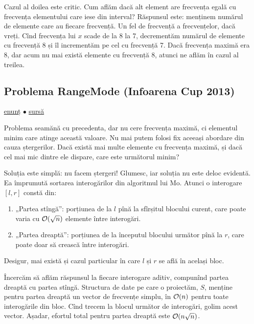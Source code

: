 \documentclass[../main.tex]{subfiles}
\begin{document}
Cazul al doilea este critic. Cum aflăm dacă alt element are frecvența egală cu frecvența elementului care iese din interval? Răspunsul este: menținem numărul de elemente care au fiecare frecvență. Un fel de frecvență a frecvențelor, dacă vreți.  Cînd frecvența lui $x$ scade de la 8 la 7, decrementăm numărul de elemente cu frecvență 8 și îl incrementăm pe cel cu frecvență 7. Dacă frecvența maximă era 8, dar acum nu mai există elemente cu frecvență 8, atunci ne aflăm în cazul al treilea.

\subsection{Problema RangeMode (Infoarena Cup 2013)}
\label{problem:rangemode}

\href{https://www.infoarena.ro/problema/rangemode}{enunț}
$\bullet$
\hyperref[code:rangemode]{sursă}

Problema seamănă cu precedenta, dar nu cere frecvența maximă, ci elementul minim care atinge această valoare. Nu mai putem folosi fix aceeași abordare din cauza ștergerilor. Dacă există mai multe elemente cu frecvența maximă, și dacă cel mai mic dintre ele dispare, care este următorul minim?

Soluția este simplă: nu facem ștergeri!  Glumesc, iar soluția nu este deloc evidentă. Ea împrumută sortarea interogărilor din algoritmul lui Mo. Atunci o interogare $[l, r]$ constă din:

\begin{enumerate}
  \item „Partea stîngă”: porțiunea de la $l$ pînă la sfîrșitul blocului curent, care poate varia cu $\mathcal{O}(\sqrt{n})$ elemente între interogări.
  \item „Partea dreaptă”: porțiunea de la începutul blocului următor pînă la $r$, care poate doar să crească între interogări.
\end{enumerate}

Desigur, mai există și cazul particular în care $l$ și $r$ se află în același bloc.

Încercăm să aflăm răspunsul la fiecare interogare aditiv, compunînd partea dreaptă cu partea stîngă. Structura de date pe care o proiectăm, $S$, menține pentru partea dreaptă un vector de frecvențe simplu, în $\mathcal{O}(n)$ pentru toate interogările din bloc. Cînd trecem la blocul următor de interogări, golim acest vector. Așadar, efortul total pentru partea dreaptă este $\mathcal{O}(n \sqrt{n})$.
\end{document}

